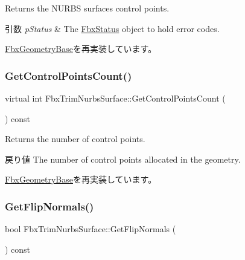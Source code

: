 Returns the N\+U\+R\+BS surface\textquotesingle{}s control points. 
\begin{DoxyParams}{引数}
{\em p\+Status} & The \hyperlink{class_fbx_status}{Fbx\+Status} object to hold error codes. \\
\hline
\end{DoxyParams}


\hyperlink{class_fbx_geometry_base_ad4db22a2f2e673c216cacdc9cd172d77}{Fbx\+Geometry\+Base}を再実装しています。

\mbox{\label{class_fbx_trim_nurbs_surface_a11c7260f31786dd8ace17769d0ccb302}} 
\subsubsection{\texorpdfstring{Get\+Control\+Points\+Count()}{GetControlPointsCount()}}
{\footnotesize\ttfamily virtual int Fbx\+Trim\+Nurbs\+Surface\+::\+Get\+Control\+Points\+Count (\begin{DoxyParamCaption}{ }\end{DoxyParamCaption}) const\hspace{0.3cm}{\ttfamily [virtual]}}

Returns the number of control points. \begin{DoxyReturn}{戻り値}
The number of control points allocated in the geometry. 
\end{DoxyReturn}


\hyperlink{class_fbx_geometry_base_aa9f42ae6a958036722670143fabf3b17}{Fbx\+Geometry\+Base}を再実装しています。

\mbox{\label{class_fbx_trim_nurbs_surface_ae8e939290c0ab69be23fa28b6c1d8cf7}} 
\subsubsection{\texorpdfstring{Get\+Flip\+Normals()}{GetFlipNormals()}}
{\footnotesize\ttfamily bool Fbx\+Trim\+Nurbs\+Surface\+::\+Get\+Flip\+Normals (\begin{DoxyParamCaption}{ }\end{DoxyParamCaption}) const\hspace{0.3cm}{\ttfamily [inline]}}

